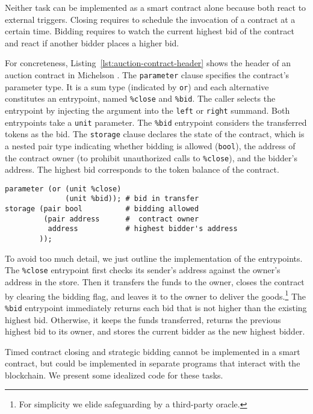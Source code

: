 \documentclass[a4paper]{llncs}
\begin{document}
Neither task can be implemented as a smart contract alone because both react
to external triggers. Closing requires to schedule the invocation of a
contract at a certain time. Bidding 
requires to watch the current highest bid of the contract and
react if another bidder places a higher bid.

For concreteness, Listing~\ref{lst:auction-contract-header} shows the
header of an auction contract in Michelson \cite{michelson}. The
\lstinline/parameter/ clause specifies the contract's parameter
type. It is a sum type (indicated by \lstinline/or/) and each
alternative constitutes an entrypoint, named \lstinline/%close/ and
\lstinline/%bid/. The caller selects the entrypoint by injecting the argument into the
\lstinline/left/ or \lstinline/right/ summand. Both entrypoints take a \lstinline{unit}
parameter. The \lstinline/%bid/ entrypoint considers the transferred
tokens as the bid.
The \lstinline/storage/ clause declares the state of the contract,
which is a nested pair type indicating whether bidding is allowed
(\lstinline{bool}), the address of the contract owner (to prohibit
unauthorized calls to \lstinline/%close/), and the bidder's
address. The highest bid corresponds to the token balance of the contract.
\begin{lstlisting}[language=michelson,numbers=none,float,caption={Header of the auction contract},label={lst:auction-contract-header},captionpos=b,emph={close,bid},emphstyle=\underbar]
parameter (or (unit %close)
              (unit %bid)); # bid in transfer
storage (pair bool          # bidding allowed
         (pair address      #  contract owner
          address           # highest bidder's address
        ));
\end{lstlisting}

To avoid too much detail, we just outline the implementation of the entrypoints. The
\lstinline/%close/ entrypoint first checks its sender's address
against the owner's address in the store. Then it transfers the funds
to the owner, closes the contract by clearing the bidding flag, and
leaves it to the owner to deliver the
goods.\footnote{For simplicity we elide safeguarding by a third-party oracle.}
The \lstinline/%bid/ entrypoint immediately returns each bid that is not higher
than the existing highest bid. Otherwise, it keeps the funds
transferred, returns the previous highest bid to its owner, and stores
the current bidder as the new highest bidder.


Timed contract closing and strategic bidding cannot be implemented in
a smart contract, but could be implemented in separate programs that
interact with the blockchain. We present some idealized code for these tasks.
\end{document}
